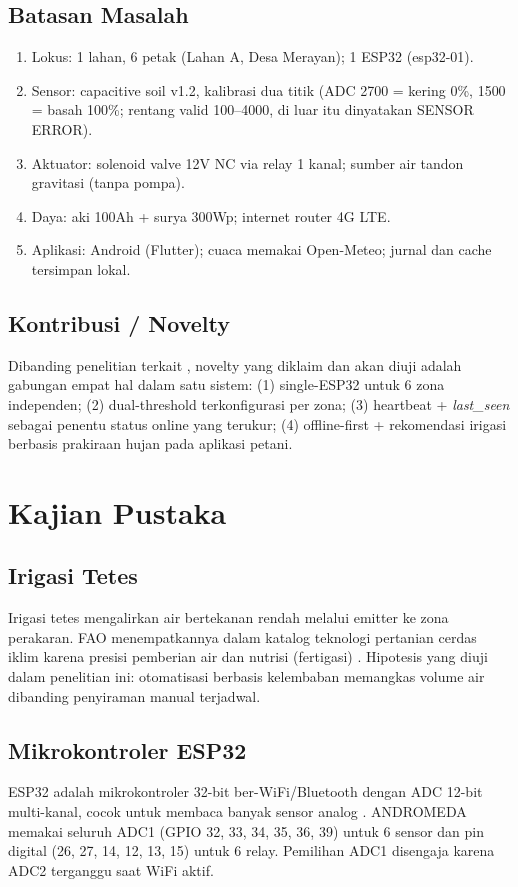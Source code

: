 \documentclass[12pt,a4paper,oneside]{report}
\begin{document}
\section{Batasan Masalah}
\begin{enumerate}[leftmargin=1.2cm]
\item Lokus: 1 lahan, 6 petak (Lahan A, Desa Merayan); 1 ESP32 (esp32-01).
\item Sensor: capacitive soil v1.2, kalibrasi dua titik (ADC 2700 = kering 0\%, 1500 = basah 100\%; rentang valid 100--4000, di luar itu dinyatakan SENSOR ERROR).
\item Aktuator: solenoid valve 12V NC via relay 1 kanal; sumber air tandon gravitasi (tanpa pompa).
\item Daya: aki 100Ah + surya 300Wp; internet router 4G LTE.
\item Aplikasi: Android (Flutter); cuaca memakai Open-Meteo; jurnal dan cache tersimpan lokal.
\end{enumerate}

\section{Kontribusi / Novelty}
Dibanding penelitian terkait \cite{saputri2025,fahrunnisa2026}, novelty yang diklaim dan akan diuji adalah gabungan empat hal dalam satu sistem: (1) single-ESP32 untuk 6 zona independen; (2) dual-threshold terkonfigurasi per zona; (3) heartbeat + \textit{last\_seen} sebagai penentu status online yang terukur; (4) offline-first + rekomendasi irigasi berbasis prakiraan hujan pada aplikasi petani.

\chapter{Kajian Pustaka}

\section{Irigasi Tetes}
Irigasi tetes mengalirkan air bertekanan rendah melalui emitter ke zona perakaran. FAO menempatkannya dalam katalog teknologi pertanian cerdas iklim karena presisi pemberian air dan nutrisi (fertigasi) \cite{fao-drip}. Hipotesis yang diuji dalam penelitian ini: otomatisasi berbasis kelembaban memangkas volume air dibanding penyiraman manual terjadwal.

\section{Mikrokontroler ESP32}
ESP32 adalah mikrokontroler 32-bit ber-WiFi/Bluetooth dengan ADC 12-bit multi-kanal, cocok untuk membaca banyak sensor analog \cite{espressif-datasheet}. ANDROMEDA memakai seluruh ADC1 (GPIO 32, 33, 34, 35, 36, 39) untuk 6 sensor dan pin digital (26, 27, 14, 12, 13, 15) untuk 6 relay. Pemilihan ADC1 disengaja karena ADC2 terganggu saat WiFi aktif.
\end{document}
